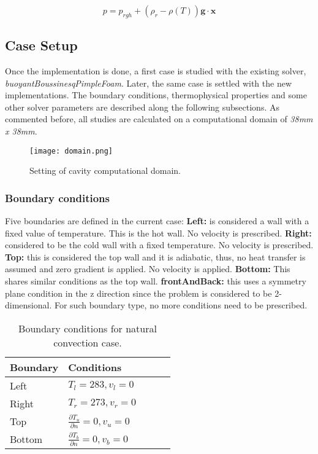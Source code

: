 \begin{equation}
	p = p_{r g h} + (\rho_{r}-\rho(T))\textbf{g}\cdot \textbf{x}
	\label{3.28}
\end{equation}
 
\subsection{Case Setup}

\setlength{\parindent}{0.5cm} Once the implementation is done, a first case is studied with the existing solver, \textit{buoyantBoussinesqPimpleFoam}. Later, the same case is settled with the new implementations.
The boundary conditions, thermophysical properties and some other solver parameters are described along the following subsections.
\newline
As commented before, all studies are calculated on a computational domain of \textit{38mm x 38mm}. 
\begin{figure}[h]
	\label{3.4fig}	\centering	
	\texttt{[image: domain.png]}
	\caption{Setting of cavity computational domain.}
\end{figure} 

\subsubsection*{Boundary conditions}
\setlength{\parindent}{0.5cm} Five boundaries are defined in the current case:
\newline
\textbf{Left:} is considered a wall with a fixed value of temperature. This is the hot wall. No velocity is prescribed.
\newline
\textbf{Right:} considered to be the cold wall with a fixed temperature. No velocity is prescribed.
\newline
\textbf{Top:} this is considered the top wall and it is adiabatic, thus, no heat transfer is assumed and zero gradient is applied. No velocity is applied.
\newline 
\textbf{Bottom:} This shares similar conditions as the top wall.
\newline
\textbf{frontAndBack:} this uses a symmetry plane condition in the z direction since the problem is considered to be 2-dimensional. For such boundary type, no more conditions need to be prescribed.
\begin{table}[h!]
	\begin{tabular}{@{}lllll@{}}
		\toprule[1pt]
		\textbf{Boundary} & \textbf{Conditions}  \\ \midrule[2pt]
		Left & $T_{l}=283, v_{l} = 0   $  \\
		Right & $T_{r}=273, v_{r} = 0 $ \\
		Top & $\frac{\partial T_{u}}{\partial n} = 0, v_{u} = 0$  \\
		Bottom & $\frac{\partial T_{b}}{\partial n} = 0, v_{b} = 0$  \\ \bottomrule[1pt]		
	\end{tabular}
	\centering
	\caption{Boundary conditions for natural convection case.}	
	\label{3.2tab}
\end{table}
\newline

